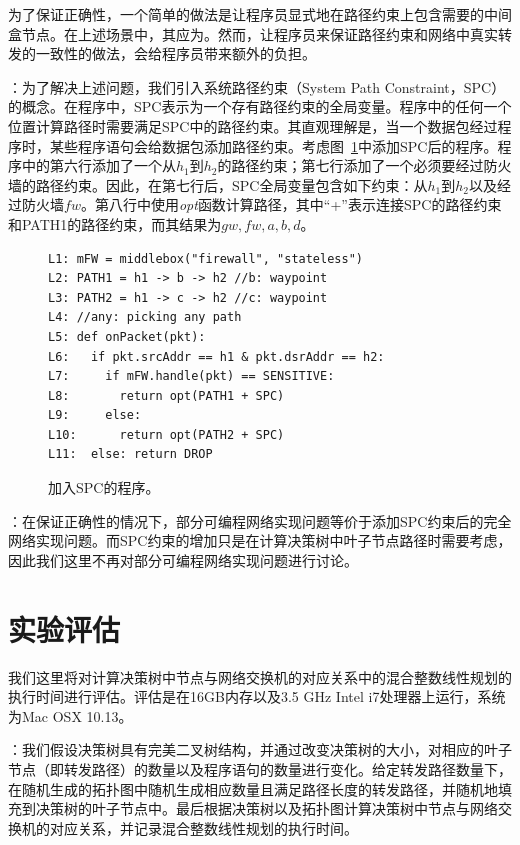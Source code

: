 为了保证正确性，一个简单的做法是让程序员显式地在路径约束上包含需要的中间盒节点。在上述场景中，其应为。然而，让程序员来保证路径约束和网络中真实转发的一致性的做法，会给程序员带来额外的负担。

：为了解决上述问题，我们引入系统路径约束（System Path Constraint，SPC）的概念。在程序中，SPC表示为一个存有路径约束的全局变量。程序中的任何一个位置计算路径时需要满足SPC中的路径约束。其直观理解是，当一个数据包经过程序时，某些程序语句会给数据包添加路径约束。考虑图~\ref{fig:code3}中添加SPC后的程序。程序中的第六行添加了一个从$h_1$到$h_2$的路径约束；第七行添加了一个必须要经过防火墙的路径约束。因此，在第七行后，SPC全局变量包含如下约束：从$h_1$到$h_2$以及经过防火墙$fw$。第八行中使用\emph{opt}函数计算路径，其中``+''表示连接SPC的路径约束和PATH1的路径约束，而其结果为$gw, fw, a, b, d$。

\begin{figure}[h]
\begin{verbatim}
L1: mFW = middlebox("firewall", "stateless")
L2: PATH1 = h1 -> b -> h2 //b: waypoint
L3: PATH2 = h1 -> c -> h2 //c: waypoint
L4: //any: picking any path
L5: def onPacket(pkt):
L6:   if pkt.srcAddr == h1 & pkt.dsrAddr == h2:
L7:     if mFW.handle(pkt) == SENSITIVE:
L8:       return opt(PATH1 + SPC)
L9:     else:
L10:      return opt(PATH2 + SPC)
L11:  else: return DROP
\end{verbatim}
    \caption{加入SPC的程序。}
\label{fig:code3}
\end{figure}

：在保证正确性的情况下，部分可编程网络实现问题等价于添加SPC约束后的完全网络实现问题。而SPC约束的增加只是在计算决策树中叶子节点路径时需要考虑，因此我们这里不再对部分可编程网络实现问题进行讨论。

\section{实验评估}

我们这里将对计算决策树中节点与网络交换机的对应关系中的混合整数线性规划的执行时间进行评估。评估是在16GB内存以及3.5 GHz Intel i7处理器上运行，系统为Mac OSX 10.13。

：我们假设决策树具有完美二叉树结构，并通过改变决策树的大小，对相应的叶子节点（即转发路径）的数量以及程序语句的数量进行变化。给定转发路径数量下，在随机生成的拓扑图中随机生成相应数量且满足路径长度的转发路径，并随机地填充到决策树的叶子节点中。最后根据决策树以及拓扑图计算决策树中节点与网络交换机的对应关系，并记录混合整数线性规划的执行时间。

